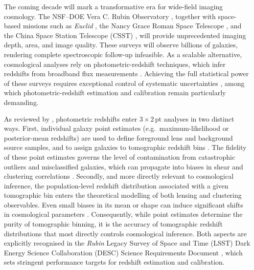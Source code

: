 The coming decade will mark a transformative era for wide-field imaging cosmology. The NSF--DOE Vera C. Rubin Observatory \citep[\textit{Rubin};][]{2009arXiv0912.0201L}, together with space-based missions such as \textit{Euclid} \citep{2025A&A...697A...1E}, the Nancy Grace Roman Space Telescope \citep{2015arXiv150303757S}, and the China Space Station Telescope (CSST) \citep{2019ApJ...883..203G}, will provide unprecedented imaging depth, area, and image quality. These surveys will observe billions of galaxies, rendering complete spectroscopic follow-up infeasible. As a scalable alternative, cosmological analyses rely on photometric-redshift techniques, which infer redshifts from broadband flux measurements \citep{1985AJ.....90..418K, 1986ApJ...303..154L}. Achieving the full statistical power of these surveys requires exceptional control of systematic uncertainties \citep{2018ARA&A..56..393M}, among which photometric-redshift estimation and calibration remain particularly demanding.

As reviewed by \citet{2022ARA&A..60..363N}, photometric redshifts enter \(3\times2\,\text{pt}\) analyses in two distinct ways. First, individual galaxy point estimates (e.g.\ maximum-likelihood or posterior-mean redshifts) are used to define foreground lens and background source samples, and to assign galaxies to tomographic redshift bins \citep{1999ApJ...522L..21H, 2002PhRvD..65f3001H}. The fidelity of these point estimates governs the level of contamination from catastrophic outliers and misclassified galaxies, which can propagate into biases in shear and clustering correlations \citep{2006ApJ...636...21M}. Secondly, and more directly relevant to cosmological inference, the population-level redshift distribution associated with a given tomographic bin enters the theoretical modelling of both lensing and clustering observables. Even small biases in its mean or shape can induce significant shifts in cosmological parameters \citep{2012MNRAS.421.2355H, 2013MNRAS.431.1547B}. Consequently, while point estimates determine the purity of tomographic binning, it is the accuracy of tomographic redshift distributions that most directly controls cosmological inference. Both aspects are explicitly recognised in the \textit{Rubin} Legacy Survey of Space and Time (LSST) Dark Energy Science Collaboration (DESC) Science Requirements Document \citep[SRD;][]{2018arXiv180901669T}, which sets stringent performance targets for redshift estimation and calibration.

